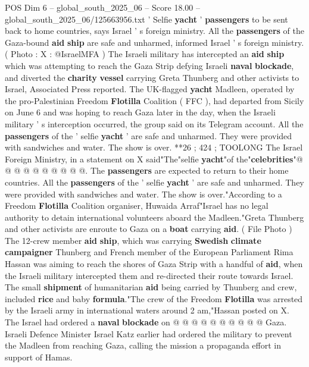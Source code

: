 \begin{textsample}{POS Dim 6 – global\_south\_2025\_06 – Score 18.00 – global\_south\_2025\_06/125663956.txt}  \label{ex:f6_pos_001}
' Selfie \textbf{yacht} ' \textbf{passengers} to be sent back to home countries, says Israel ' s foreign ministry.
All the \textbf{passengers} of the Gaza-bound \textbf{aid} \textbf{ship} are safe and unharmed, informed Israel ' s foreign ministry. ( Photo : X : @IsraelMFA ) The Israeli military has intercepted an \textbf{aid} \textbf{ship} which was attempting to reach the Gaza Strip defying Israeli \textbf{naval} \textbf{blockade}, and diverted the \textbf{charity} \textbf{vessel} carrying Greta Thunberg and other activists to Israel, Associated Press reported.
The UK-flagged \textbf{yacht} Madleen, operated by the pro-Palestinian Freedom \textbf{Flotilla} Coalition ( FFC ), had departed from Sicily on June 6 and was hoping to reach Gaza later in the day, when the Israeli military ' s interception occurred, the group said on its Telegram account.
All the \textbf{passengers} of the ' selfie \textbf{yacht} ' are safe and unharmed.
They were provided with sandwiches and water.
The show is over. **26 ; 424 ; TOOLONG The Israel Foreign Ministry, in a statement on X said"The"selfie \textbf{yacht}"of the"\textbf{celebrities}"@ @ @ @ @ @ @ @ @ @.
The \textbf{passengers} are expected to return to their home countries.
All the \textbf{passengers} of the ' selfie \textbf{yacht} ' are safe and unharmed.
They were provided with sandwiches and water.
The show is over."According to a Freedom \textbf{Flotilla} Coalition organiser, Huwaida Arraf"Israel has no legal authority to detain international volunteers aboard the Madleen."Greta Thunberg and other activists are enroute to Gaza on a \textbf{boat} carrying \textbf{aid}. ( File Photo ) The 12-crew member \textbf{aid} \textbf{ship}, which was carrying \textbf{Swedish} \textbf{climate} \textbf{campaigner} Thunberg and French member of the European Parliament Rima Hassan was aiming to reach the shores of Gaza Strip with a handful of \textbf{aid}, when the Israeli military intercepted them and re-directed their route towards Israel.
The small \textbf{shipment} of humanitarian \textbf{aid} being carried by Thunberg and crew, included \textbf{rice} and baby \textbf{formula}."The crew of the Freedom \textbf{Flotilla} was arrested by the Israeli army in international waters around 2 am,"Hassan posted on X.
The Israel had ordered a \textbf{naval} \textbf{blockade} on @ @ @ @ @ @ @ @ @ @ Gaza.
Israeli Defence Minister Israel Katz earlier had ordered the military to prevent the Madleen from reaching Gaza, calling the mission a propaganda effort in support of Hamas.

\end{textsample}
